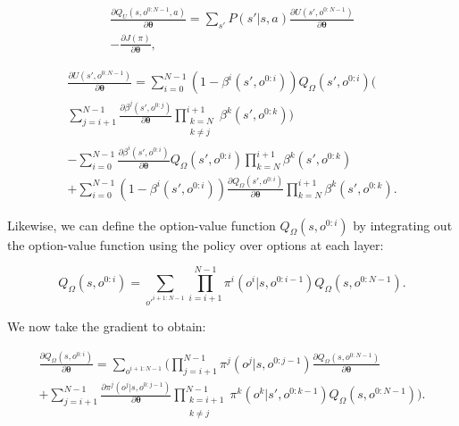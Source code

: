 \documentclass[letterpaper]{article} %
\begin{document}
\begin{equation} 
\begin{split}
\frac{ \partial Q_U(s,o^{0:N-1},a)}{\partial \bm{\theta}} =  \sum_{s'} P (s'|s,a) \frac{\partial U(s',o^{0:N-1})}{\partial \bm{\theta}}\\
- \frac{\partial J(\pi)}{\partial \bm{\theta}},
\end{split}
\end{equation}


\begin{equation} \label{eq31}
\begin{split}
\frac{\partial U(s',o^{0:N-1})}{\partial \bm{\theta}} = \sum_{i=0}^{N - 1}(1-\beta^i(s',o^{0:i})) Q_\Omega(s',o^{0:i}) \bigg(\\
\sum_{j=i+1}^{N-1} \frac{ \partial \beta^j(s',o^{0:j})}{\partial \bm{\theta}} \prod_{\substack{k=N \\ k \neq j}}^{i+1} \beta^k(s',o^{0:k}) \bigg)\\
- \sum_{i=0}^{N - 1}\frac{ \partial \beta^i(s',o^{0:i})}{\partial \bm{\theta}} Q_\Omega(s',o^{0:i}) \prod_{k=N}^{i+1} \beta^k(s',o^{0:k}) \\
+ \sum_{i=0}^{N - 1}(1-\beta^i(s',o^{0:i})) \frac{\partial Q_\Omega(s',o^{0:i})}{\partial \bm{\theta}} \prod_{k=N}^{i+1} \beta^k(s',o^{0:k}).
\end{split}
\end{equation}

Likewise, we can define the option-value function $Q_\Omega(s,o^{0:i})$ by integrating out the option-value function using the policy over options at each layer:

\begin{equation} 
Q_\Omega(s,o^{0:i}) = \sum_{o'^{i+1:N-1}} \prod_{i=i+1}^{N-1} \pi^i(o^i|s,o^{0:i-1}) Q_\Omega(s,o^{0:N-1}).
\end{equation}

We now take the gradient to obtain:

\begin{equation}   \label{eq35}
\begin{split}
\frac{\partial Q_\Omega(s,o^{0:i})}{\partial \bm{\theta}} = \sum_{o^{i+1:N-1}} \bigg( \prod_{j=i+1}^{N-1} \pi^j(o^j|s,o^{0:j-1}) \frac{\partial Q_\Omega(s,o^{0:N-1})}{\partial \bm{\theta}} \\
+ \sum_{j=i+1}^{N-1} \frac{ \partial \pi^j(o^j|s,o^{0:j-1})}{\partial \bm{\theta}} \prod_{\substack{k=i+1 \\ k \neq j}}^{N-1} \pi^k(o^k|s',o^{0:k-1}) Q_\Omega(s,o^{0:N-1}) \bigg).
\end{split}
\end{equation}
\end{document}
